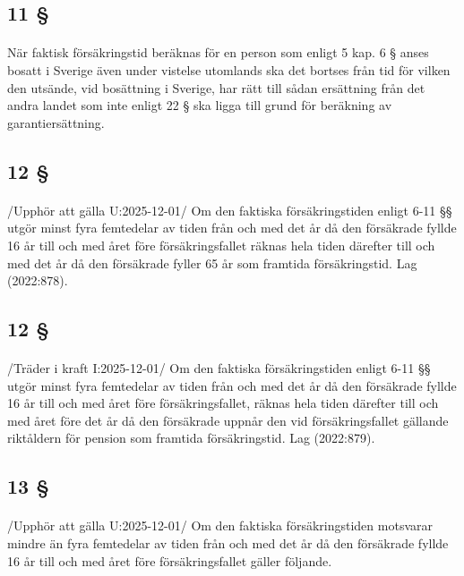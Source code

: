 \documentclass[a4paper,notitlepage,openany,10pt]{book}
\begin{document}
\subsection*{11 §}
\paragraph*{}
När faktisk försäkringstid beräknas för en person som enligt 5 kap. 6 § anses bosatt i Sverige även under vistelse utomlands ska det bortses från tid för vilken den utsände, vid bosättning i Sverige, har rätt till sådan ersättning från det andra landet som inte enligt 22 § ska ligga till grund för beräkning av garantiersättning.
\subsection*{12 §}
\paragraph*{}
/Upphör att gälla U:2025-12-01/
Om den faktiska försäkringstiden enligt 6-11 §§ utgör minst fyra femtedelar av tiden från och med det år då den försäkrade fyllde 16 år till och med året före försäkringsfallet räknas hela tiden därefter till och med det år då den försäkrade fyller 65 år som framtida försäkringstid.
Lag (2022:878).
\subsection*{12 §}
\paragraph*{}
/Träder i kraft I:2025-12-01/
Om den faktiska försäkringstiden enligt 6-11 §§ utgör minst fyra femtedelar av tiden från och med det år då den försäkrade fyllde 16 år till och med året före försäkringsfallet, räknas hela tiden därefter till och med året före det år då den försäkrade uppnår den vid försäkringsfallet gällande riktåldern för pension som framtida försäkringstid.
Lag (2022:879).
\subsection*{13 §}
\paragraph*{}
/Upphör att gälla U:2025-12-01/
Om den faktiska försäkringstiden motsvarar mindre än fyra femtedelar av tiden från och med det år då den försäkrade fyllde 16 år till och med året före försäkringsfallet gäller följande.
\end{document}
